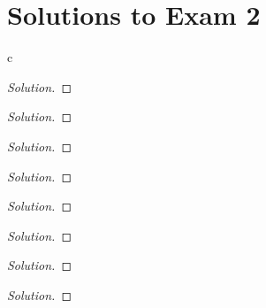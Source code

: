 \section*{Solutions to Exam 2}
\begin{problem}
c
\end{problem}
\begin{proof}[Solution]
\end{proof}

\begin{problem}
\end{problem}
\begin{proof}[Solution]
\end{proof}

\begin{problem}
\end{problem}
\begin{proof}[Solution]
\end{proof}

\begin{problem}
\end{problem}
\begin{proof}[Solution]
\end{proof}

\begin{problem}
\end{problem}
\begin{proof}[Solution]
\end{proof}

\begin{problem}
\end{problem}
\begin{proof}[Solution]
\end{proof}

\begin{problem}
\end{problem}
\begin{proof}[Solution]
\end{proof}

\begin{problem}
\end{problem}
\begin{proof}[Solution]
\end{proof}

